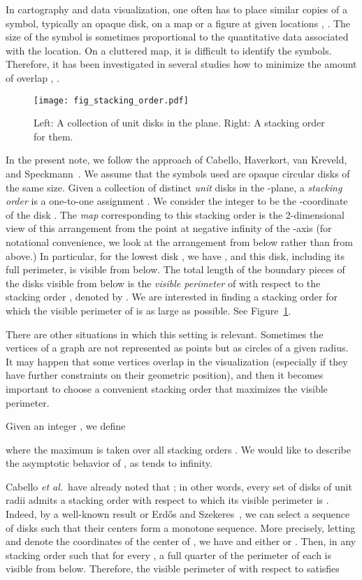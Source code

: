 \documentclass[11pt]{article}
\begin{document}
In cartography and data visualization, one often has to place similar copies of a symbol, typically an opaque disk, on a map or a figure at given locations \cite{De99}, \cite{Gr90}. The size of the symbol is sometimes proportional to the quantitative data associated with the location. On a cluttered map, it is difficult to identify the symbols. Therefore, it has been investigated in several studies how to minimize the amount of overlap \cite{GrC78}, \cite{SlM03}.

\begin{figure}
\centerline{\texttt{[image: fig\_stacking\_order.pdf]}}
\caption{\label{fig_stacking_order}Left: A collection of unit disks in the plane. Right: A stacking order for them.}
\end{figure}


In the present note, we follow the approach of Cabello, Haverkort, van
Kreveld, and Speckmann~\cite{CaH10}. We assume that the symbols used are
opaque circular disks of the same size. Given a collection  of 
distinct {\em unit} disks in the -plane, a {\em stacking order} is a one-to-one assignment . We consider the integer  to be the -coordinate of the disk . The {\em map} corresponding to this stacking order is the 2-dimensional view of this arrangement from the point at negative infinity of the -axis (for notational convenience, we look at the arrangement from below rather than from above.) In particular, for the lowest disk , we have , and this disk, including its full perimeter, is visible from below. The total length of the
boundary pieces of the disks visible from below is the {\em visible perimeter}
of  with respect to the stacking order , denoted by . We are interested in finding a stacking order for which the visible
perimeter of  is as large as possible. See
Figure~\ref{fig_stacking_order}.

There are other situations in which this setting is relevant. Sometimes the vertices of a graph are not represented as points but as circles of a given radius. It may happen that
some vertices overlap in the visualization (especially if they have
further constraints on their geometric position), and then it becomes important to choose a
convenient stacking order that maximizes the visible perimeter.

Given an integer , we define

where the maximum is taken over all stacking orders .
We would like to describe the asymptotic behavior of , as  tends to infinity.

Cabello {\em et al.}\ have already noted that ; in other
words, every set  of  disks of unit radii admits
a stacking order with respect to which its visible perimeter is
. Indeed, by a well-known result or Erd\H os and
Szekeres~\cite{ErSz35}, we can select a sequence of 
disks  such that their
centers form a monotone sequence. More precisely, letting  and 
denote the coordinates of the center of , we have  and either  or . Then, in any stacking order  such that  for every
, a full quarter of the perimeter of each  is visible from below. Therefore, the visible perimeter of  with respect to  satisfies 
\end{document}
